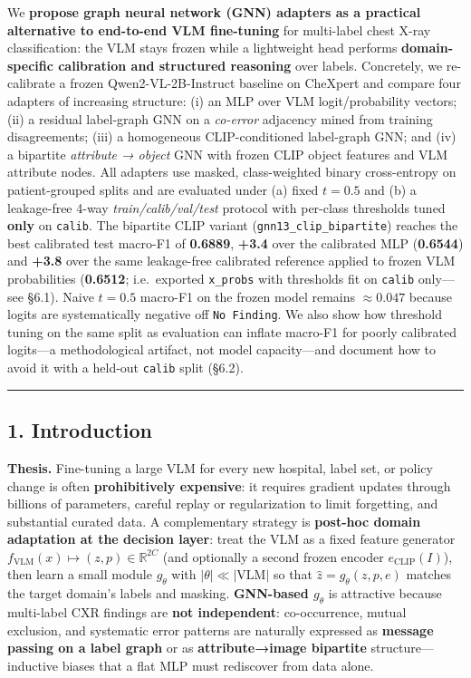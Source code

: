 \documentclass[
  11pt,
]{article}
\begin{document}
We \textbf{propose graph neural network (GNN) adapters as a practical
alternative to end-to-end VLM fine-tuning} for multi-label chest X-ray
classification: the VLM stays frozen while a lightweight head performs
\textbf{domain-specific calibration and structured reasoning} over
labels. Concretely, we re-calibrate a frozen Qwen2-VL-2B-Instruct
baseline on CheXpert and compare four adapters of increasing structure:
(i) an MLP over VLM logit/probability vectors; (ii) a residual
label-graph GNN on a \emph{co-error} adjacency mined from training
disagreements; (iii) a homogeneous CLIP-conditioned label-graph GNN; and
(iv) a bipartite \emph{attribute → object} GNN with frozen CLIP object
features and VLM attribute nodes. All adapters use masked,
class-weighted binary cross-entropy on patient-grouped splits and are
evaluated under (a) fixed \(t=0.5\) and (b) a leakage-free 4-way
\emph{train/calib/val/test} protocol with per-class thresholds tuned
\textbf{only} on \texttt{calib}. The bipartite CLIP variant
(\texttt{gnn13\_clip\_bipartite}) reaches the best calibrated test
macro-F1 of \textbf{0.6889}, \textbf{+3.4} over the calibrated MLP
(\textbf{0.6544}) and \textbf{+3.8} over the same leakage-free
calibrated reference applied to frozen VLM probabilities
(\textbf{0.6512}; i.e.~exported \texttt{x\_probs} with thresholds fit on
\texttt{calib} only---see §6.1). Naive \(t=0.5\) macro-F1 on the frozen
model remains \(\approx 0.047\) because logits are systematically
negative off \texttt{No\ Finding}. We also show how threshold tuning on
the same split as evaluation can inflate macro-F1 for poorly calibrated
logits---a methodological artifact, not model capacity---and document
how to avoid it with a held-out \texttt{calib} split (§6.2).

\begin{center}\rule{0.5\linewidth}{0.5pt}\end{center}

\subsection{1. Introduction}\label{introduction}

\textbf{Thesis.} Fine-tuning a large VLM for every new hospital, label
set, or policy change is often \textbf{prohibitively expensive}: it
requires gradient updates through billions of parameters, careful replay
or regularization to limit forgetting, and substantial curated data. A
complementary strategy is \textbf{post-hoc domain adaptation at the
decision layer}: treat the VLM as a fixed feature generator
\(f_{\text{VLM}}(x)\mapsto (z,p)\in\mathbb{R}^{2C}\) (and optionally a
second frozen encoder \(e_{\text{CLIP}}(I)\)), then learn a small module
\(g_\theta\) with \(\lvert\theta\rvert \ll \lvert\text{VLM}\rvert\) so
that \(\hat z = g_\theta(z,p,e)\) matches the target domain's labels and
masking. \textbf{GNN-based \(g_\theta\)} is attractive because
multi-label CXR findings are \textbf{not independent}: co-occurrence,
mutual exclusion, and systematic error patterns are naturally expressed
as \textbf{message passing on a label graph} or as
\textbf{attribute→image bipartite} structure---inductive biases that a
flat MLP must rediscover from data alone.
\end{document}
